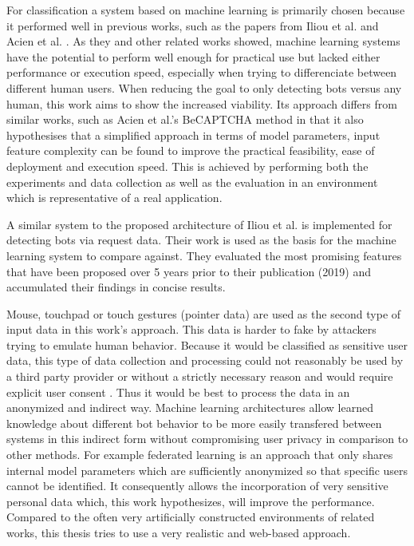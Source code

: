 \documentclass[
    fontsize=12pt,
    headings=small,
    parskip=half,           %
    bibliography=totoc,
    numbers=noenddot,       %
    open=any,               %
    final,                   %
    table
]{scrreprt}
\begin{document}
For classification a system based on machine learning is primarily chosen because it performed well in previous works, such as the papers from Iliou et al. \cite{10.1145/3339252.3339267} and Acien et al. \cite{Acien2020BeCAPTCHAMouseSM}. As they and other related works showed, machine learning systems have the potential to perform well enough for practical use but lacked either performance or execution speed, especially when trying to differenciate between different human users. When reducing the goal to only detecting bots versus any human, this work aims to show the increased viability. Its approach differs from similar works, such as Acien et al.'s BeCAPTCHA method \cite{Acien2020BeCAPTCHAMouseSM} in that it also hypothesises that a simplified approach in terms of model parameters, input feature complexity can be found to improve the practical feasibility, ease of deployment and execution speed. This is achieved by performing both the experiments and data collection as well as the evaluation in an environment which is representative of a real application.

A similar system to the proposed architecture of Iliou et al. \cite{10.1145/3339252.3339267} is implemented for detecting bots via request data. Their work is used as the basis for the machine learning system to compare against. They evaluated the most promising features that have been proposed over 5 years prior to their publication (2019) and accumulated their findings in concise results.

Mouse, touchpad or touch gestures (pointer data) are used as the second type of input data in this work's approach. This data is harder to fake by attackers trying to emulate human behavior. Because it would be classified as sensitive user data, this type of data collection and processing could not reasonably be used by a third party provider or without a strictly necessary reason and would require explicit user consent \cite{GDPR}. Thus it would be best to process the data in an anonymized and indirect way. Machine learning architectures allow learned knowledge about different bot behavior to be more easily transfered between systems in this indirect form without compromising user privacy in comparison to other methods. For example federated learning \cite{DBLP:journals/corr/KonecnyMR15} \cite{DBLP:journals/corr/KonecnyMRR16} is an approach that only shares internal model parameters which are sufficiently anonymized so that specific users cannot be identified. It consequently allows the incorporation of very sensitive personal data which, this work hypothesizes, will improve the performance. Compared to the often very artificially constructed environments of related works, this thesis tries to use a very realistic and web-based approach.
\end{document}
